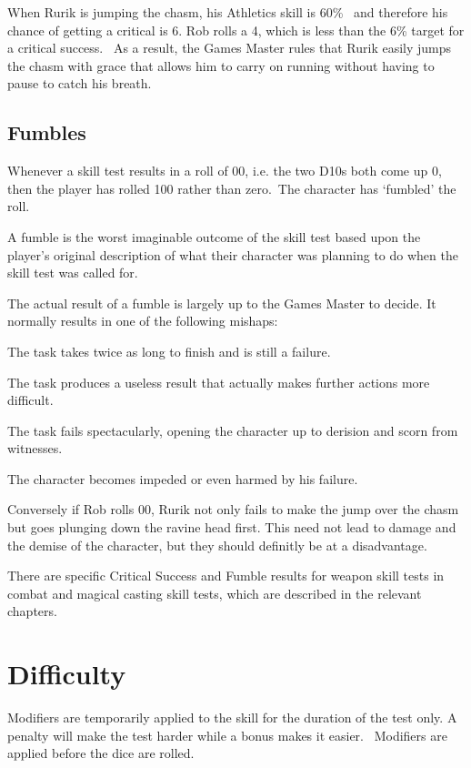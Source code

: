 \begin{rpg-examplebox}
When Rurik is jumping the chasm, his Athletics skill is 60\%  and therefore his chance of getting a critical is 6. Rob rolls a 4, which is less than the 6\% target for a critical success.  As a result, the Games Master rules that Rurik easily jumps the chasm with grace that allows him to carry on running without having to pause to catch his breath.
\end{rpg-examplebox}

\subsection{Fumbles}
Whenever a skill test results in a roll of 00, i.e. the two D10s both come up 0, then the player has rolled 100 rather than zero. The character has ‘fumbled’ the roll. 

A fumble is the worst imaginable outcome of the skill test based upon the player’s original description of what their character was planning to do when the skill test was called for.

The actual result of a fumble is largely up to the Games Master to decide. It normally results in one of the following mishaps: 

\begin{rpg-list}
\item The task takes twice as long to finish and is still a failure. 
\item The task produces a useless result that actually makes further actions more difficult. 
\item The task fails spectacularly, opening the character up to derision and scorn from witnesses. 
\item The character becomes impeded or even harmed by his failure. 
\end{rpg-list}

Conversely if Rob rolls 00, Rurik not only fails to make the jump over the chasm but goes plunging down the ravine head first. This need not lead to damage and the demise of the character, but they should definitly be at a disadvantage.

There are specific Critical Success and Fumble results for weapon skill tests in combat and magical casting skill tests, which are described in the relevant chapters.


\section{Difficulty}
Modifiers are temporarily applied to the skill for the duration of the test only. A penalty will make the test harder while a bonus makes it easier.  Modifiers are applied before the dice are rolled.

